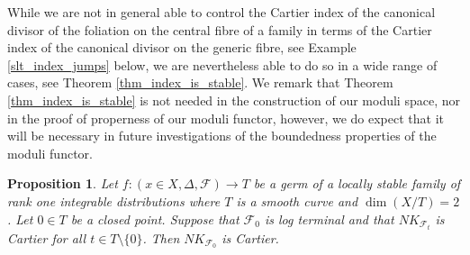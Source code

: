 \documentclass[12pt, a4paper]{amsart}
\newcounter{Theorem}
\newtheorem{proposition}[theorem]{Proposition}
\theoremstyle{definition}
\theoremstyle{named}
\begin{document}
While we are not in general able to control the Cartier index of the canonical divisor of the foliation on the central fibre of a family in terms of the Cartier index of the canonical divisor on the generic fibre, see Example \ref{slt_index_jumps} below, we are nevertheless able to do so in a wide range of cases, see
Theorem \ref{thm_index_is_stable}.
We remark that Theorem \ref{thm_index_is_stable}
is not needed in the construction of our moduli space, nor in the proof of properness of our moduli functor, however, we do expect that it will be necessary in future investigations of the boundedness properties of the moduli functor.  


\begin{proposition}
\label{prop_lt_index}
    Let $f\colon (x \in X, \Delta, \mathcal F) \rightarrow T$ be a germ of a locally stable family of rank one integrable distributions where $T$ is a smooth curve and $\dim (X/T) =2$.  Let $0 \in T$ be a closed point.  
    Suppose that $\mathcal F_0$ is log terminal and that $NK_{\mathcal F_t}$
    is Cartier for all $t \in T \setminus \{0\}$.  
    Then $NK_{\mathcal F_{0}}$ is Cartier.
\end{proposition}
\end{document}
